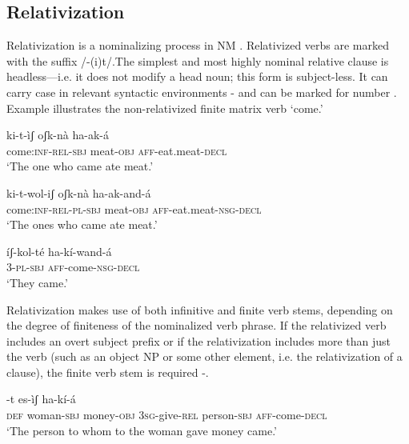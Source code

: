 \documentclass[output=paper]{langsci/langscibook}
\begin{document}
\subsection{Relativization}\label{sec:mahland:2.2}

Relativization is a nominalizing process in NM \citep[225]{Ahland2012}. Relativized verbs are marked with the suffix /-(i)t/.The simplest and most highly nominal relative clause is headless—i.e. it does not modify a head noun; this form is subject-less. It can carry case in relevant syntactic environments - and can be marked for number . Example  illustrates the non-relativized finite matrix verb `come.' 

\ea\label{ex:mahland:40}
\gll ki-t-ìʃ                    oʃk-nà      ha-ak-á  \\
come:\textsc{inf-rel-sbj}   meat-\textsc{obj}   \textsc{aff}-eat.meat-\textsc{decl}\\
\glt `The one who came ate meat.'
\z

\ea\label{ex:mahland:41}
\gll ki-t-wol-iʃ           oʃk-nà       ha-ak-and-á\\
come:\textsc{inf-rel-pl-sbj}   meat-\textsc{obj}   \textsc{aff}-eat.meat-\textsc{nsg-decl} \\
\glt `The ones who came ate meat.' 
\z

\ea\label{ex:mahland:42}
\gll íʃ-kol-té    ha-kí-wand-á \\
\textsc{3-pl-sbj} \textsc{aff}{}-come-\textsc{nsg-decl} \\
\glt `They came.'
\z

Relativization makes use of both infinitive and finite verb stems, depending on the degree of finiteness of the nominalized verb phrase. If the relativized verb includes an overt subject prefix or if the relativization includes more than just the verb (such as an object NP or some other element, i.e. the relativization of a clause), the finite verb stem is required -. 


\ea\label{ex:mahland:43}
-t  es-ìʃ           ha-kí-{\downstep}á\\
 {\db}\textsc{def}     woman\textsc{{}-sbj}   money\textsc{{}-obj}   \textsc{3sg}{}-give\textsc{{}-rel}  person\textsc{{}-sbj}   \textsc{aff}{}-come-\textsc{decl} \\
\glt `The person to whom to the woman gave money came.'
\z
\end{document}
